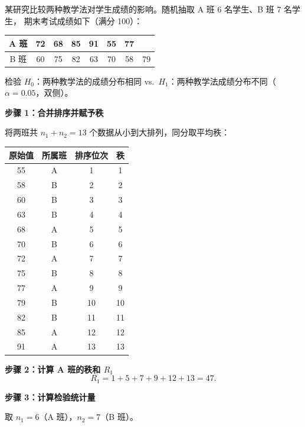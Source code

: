 \begin{example}
某研究比较两种教学法对学生成绩的影响。随机抽取 A 班 6 名学生、B 班 7 名学生，
期末考试成绩如下（满分 100）：\par
\medskip
\begin{center}
\begin{tabular}{c|ccccccc}
    \toprule
    A 班 & 72 & 68 & 85 & 91 & 55 & 77 & \\
    \midrule
    B 班 & 60 & 75 & 82 & 63 & 70 & 58 & 79 \\
    \bottomrule
\end{tabular}
\end{center}

检验 $H_0$：两种教学法的成绩分布相同 vs.\ $H_1$：两种教学法成绩分布不同（$\alpha = 0.05$，双侧）。

\textbf{步骤 1：合并排序并赋予秩}

将两班共 $n_1+n_2 = 13$ 个数据从小到大排列，同分取平均秩：

\begin{center}
\begin{tabular}{c|c|c|c}
    \toprule
    原始值 & 所属班 & 排序位次 & 秩 \\
    \midrule
    55 & A & 1  & 1 \\
    58 & B & 2  & 2 \\
    60 & B & 3  & 3 \\
    63 & B & 4  & 4 \\
    68 & A & 5  & 5 \\
    70 & B & 6  & 6 \\
    72 & A & 7  & 7 \\
    75 & B & 8  & 8 \\
    77 & A & 9  & 9 \\
    79 & B & 10 & 10 \\
    82 & B & 11 & 11 \\
    85 & A & 12 & 12 \\
    91 & A & 13 & 13 \\
    \bottomrule
\end{tabular}
\end{center}

\textbf{步骤 2：计算 A 班的秩和 $R_1$}
\begin{equation}
    R_1 = 1 + 5 + 7 + 9 + 12 + 13 = 47.
\end{equation}

\textbf{步骤 3：计算检验统计量}

取 $n_1 = 6$（A 班），$n_2 = 7$（B 班）。


\end{example}
